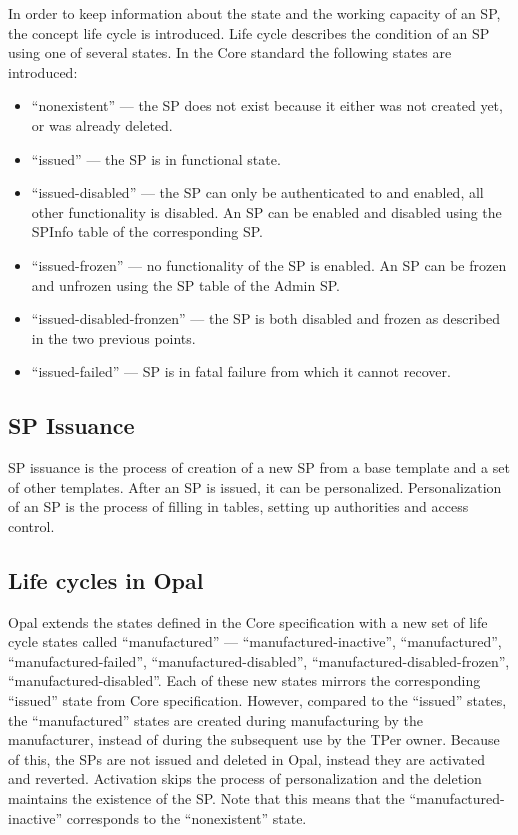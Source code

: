 In order to keep information about the state and the working capacity of an SP, the concept life cycle is introduced. Life cycle describes the condition of an SP using one of several states. In the Core standard the following states are introduced: 
\begin{itemize}
\item ``nonexistent'' --- the SP does not exist because it either was not created yet, or was already deleted.
\item ``issued'' --- the SP is in functional state.
\item ``issued-disabled'' --- the SP can only be authenticated to and enabled, all other functionality is disabled. An SP can be enabled and disabled using the SPInfo table of the corresponding SP.
\item ``issued-frozen'' --- no functionality of the SP is enabled. An SP can be frozen and unfrozen using the SP table of the Admin SP.
\item ``issued-disabled-fronzen'' --- the SP is both disabled and frozen as described in the two previous points.
\item ``issued-failed'' --- SP is in fatal failure from which it cannot recover.
\end{itemize}

\subsection{SP Issuance}

SP issuance is the process of creation of a new SP from a base template and a set of other templates. After an SP is issued, it can be personalized. Personalization of an SP is the process of filling in tables, setting up authorities and access control.

\subsection{Life cycles in Opal}

Opal extends the states defined in the Core specification with a new set of life cycle states called ``manufactured'' --- ``manufactured-inactive'', ``manufactured'', ``manufactured-failed'', ``manufactured-disabled'', ``manufactured-disabled-frozen'', ``manufactured-disabled''. Each of these new states mirrors the corresponding ``issued'' state from Core specification. However, compared to the ``issued'' states, the ``manufactured'' states are created during manufacturing by the manufacturer, instead of during the subsequent use by the TPer owner. Because of this, the SPs are not issued and deleted in Opal, instead they are activated and reverted. Activation skips the process of personalization and the deletion maintains the existence of the SP. Note that this means that the ``manufactured-inactive'' corresponds to the ``nonexistent'' state.


